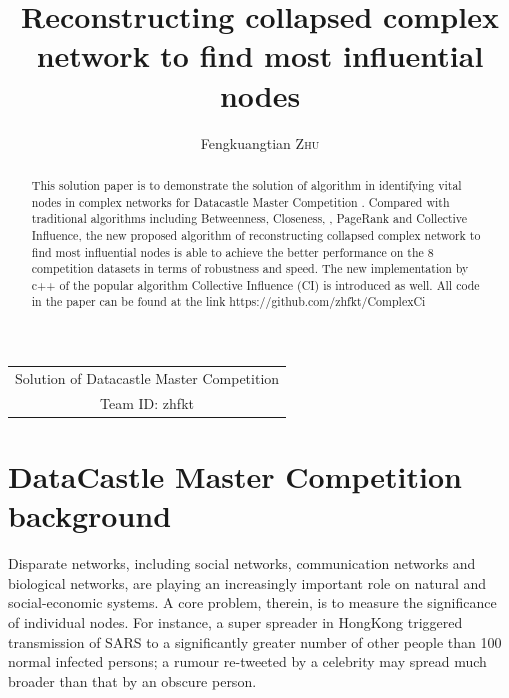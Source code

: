 \documentclass{article}
\title{ Reconstructing collapsed complex network to find most influential nodes  } %
\author{Fengkuangtian \textsc{Zhu}} %
\begin{document}
	
	\maketitle %
	
	
	
	\begin{center}
		\begin{tabular}{c}
			Solution of Datacastle Master Competition	\\
			Team ID: zhfkt 
		\end{tabular}
	\end{center}
	
	\begin{abstract}
		This solution paper is to demonstrate the solution of algorithm in identifying vital nodes in complex networks for Datacastle Master Competition . Compared with traditional algorithms including Betweenness\cite{wikiBetweennesscentrality}, Closeness\cite{wikiClosenesscentrality}, \cite{wikiCentrality}, PageRank\cite{wikiPageRank} and Collective Influence\cite{morone2015influence}\cite{morone2016collective}, the new proposed algorithm of reconstructing collapsed complex network to find most influential nodes is able to achieve the better performance on the 8 competition datasets in terms of robustness\cite{schneider2011mitigation} and speed. The new implementation by c++ of the popular algorithm Collective Influence (CI) is introduced as well. All code in the paper can be found at the link https://github.com/zhfkt/ComplexCi \cite{zhfktgithub} \cite{zhfkt2017887989}
	\end{abstract}
	
	
	\section{DataCastle Master Competition background}
	
		
	Disparate networks, including social networks, communication networks and biological networks, are playing an increasingly important role on natural and social-economic systems. A core problem, therein, is to measure the significance of individual nodes. For instance, a super spreader in HongKong triggered transmission of SARS to a significantly greater number of other people than 100 normal infected persons; a rumour re-tweeted by a celebrity may spread much broader than that by an obscure person.
	
\end{document}
